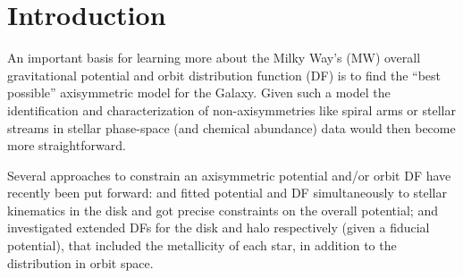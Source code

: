\documentclass[iop,revtex4,numberedappendix,appendixfloats]{emulateapj}
\begin{document}
\section{Introduction} \label{sec:intro}

An important basis for learning more about the Milky Way's (MW) overall gravitational potential and orbit distribution function (DF) is to find the ``best possible'' axisymmetric model for the Galaxy. Given such a model the identification and characterization of non-axisymmetries like spiral arms or stellar streams in stellar phase-space (and chemical abundance) data would then become more straightforward.

Several approaches to constrain an axisymmetric potential and/or orbit DF have recently been put forward: \citet{2013ApJ...779..115B} and \citet{2014MNRAS.445.3133P} fitted potential and DF simultaneously to stellar kinematics in the disk and got precise constraints on the overall potential; \citet{2015MNRAS.449.3479S} and \citet{2016MNRAS.460.1725D} investigated extended DFs for the disk and halo respectively (given a fiducial potential), that included the metallicity of each star, in addition to the distribution in orbit space.
\end{document}

